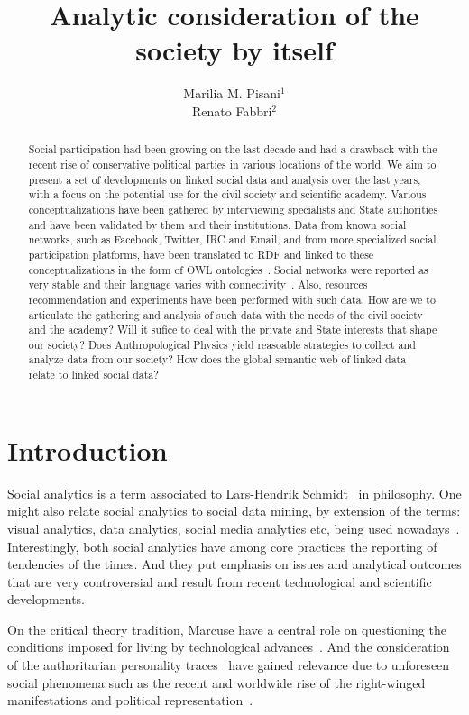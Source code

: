 \documentclass[letterpaper,10pt]{article}
\begin{document}
\title{Analytic consideration of the society by itself}

\author{Marilia M. Pisani$^1$\\
Renato Fabbri$^2$}
\address{$^1$CCNH/UFABC, $^2$IFSC/USP}

\begin{abstract}
Social participation had been growing on the last decade
and had a drawback with the recent rise of conservative political parties 
in various locations of the world.
We aim to present a set of developments on linked social data
and analysis over the last years, with a focus
on the potential use for the civil society and scientific academy.
Various conceptualizations have been gathered by interviewing specialists
and State authorities and have been validated by them and their institutions.
Data from known social networks, such as Facebook, Twitter, IRC and Email,
and from more specialized social participation platforms, have been
	translated to RDF and linked to these conceptualizations in the form of OWL ontologies~\cite{losd,pnud5}.
Social networks were reported as very stable and their language varies
	with connectivity~\cite{tese,stab}.
	Also, resources recommendation and experiments have been performed with such data.
	How are we to articulate the gathering and analysis 
	of such data with the needs of the civil society and the academy?
	Will it sufice to deal with the private and State interests
	that shape our society?
	Does Anthropological Physics yield reasoable strategies
	to collect and analyze data from our society?
	How does the global semantic web of linked data~\cite{GGG}
	relate to linked social data?
\end{abstract}

\section{Introduction}
Social analytics is a term associated to Lars-Hendrik Schmidt~\cite{cite}
in philosophy.
One might also relate social analytics to social data mining,
by extension of the terms: visual analytics, data analytics, social media analytics etc,
being used nowadays~\cite{wVA,wDA,wSMA,wSNA}.
Interestingly, both social analytics 
have among core practices the reporting of tendencies of the times.
And they put emphasis on issues and analytical outcomes
that are very controversial and result from recent technological and scientific developments.

On the critical theory tradition,
Marcuse have a central role on
questioning the conditions
imposed for living by technological advances~\cite{m1,m2,m3}.
And the consideration of the authoritarian personality traces~\cite{au}
have gained relevance due to unforeseen social phenomena
such as the recent and worldwide rise of the right-winged manifestations
and political representation~\cite{rise}.
\end{document}
